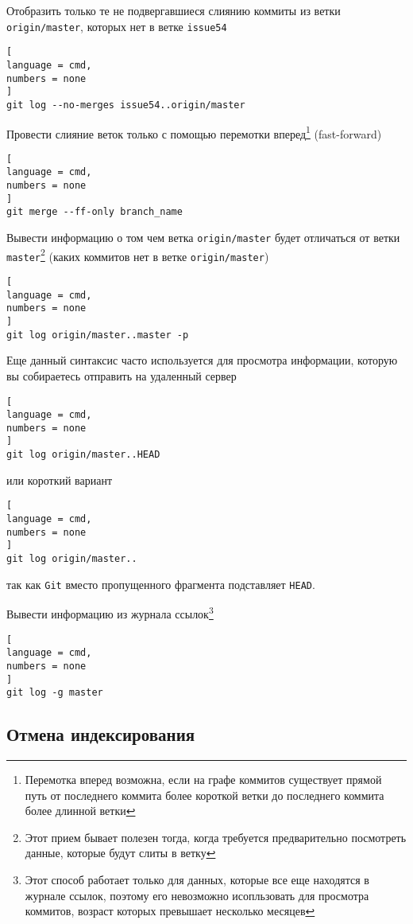 \documentclass[%
	11pt,
	a4paper,
	utf8,
		]{article}
\begin{document}
Отобразить только те не подвергавшиеся слиянию коммиты из ветки \texttt{origin/master}, которых нет в ветке \texttt{issue54}

\begin{lstlisting}[
language = cmd,
numbers = none
]
git log --no-merges issue54..origin/master
\end{lstlisting}

Провести слияние веток только с помощью перемотки вперед\footnote{Перемотка вперед возможна, если на графе коммитов существует прямой путь от последнего коммита более короткой ветки до последнего коммита более длинной ветки} (fast-forward)
\begin{lstlisting}[
language = cmd,
numbers = none
]
git merge --ff-only branch_name
\end{lstlisting}

Вывести информацию о том чем ветка \texttt{origin/master} будет отличаться от ветки \texttt{master}\footnote{Этот прием бывает полезен тогда, когда требуется предварительно посмотреть данные, которые будут слиты в ветку} (каких коммитов нет в ветке \texttt{origin/master})

\begin{lstlisting}[
language = cmd,
numbers = none
]
git log origin/master..master -p
\end{lstlisting}

Еще данный синтаксис часто используется для просмотра информации, которую вы собираетесь отправить на удаленный сервер

\begin{lstlisting}[
language = cmd,
numbers = none
]
git log origin/master..HEAD
\end{lstlisting}
или короткий вариант
\begin{lstlisting}[
language = cmd,
numbers = none
]
git log origin/master..
\end{lstlisting}
так как \texttt{Git} вместо пропущенного фрагмента подставляет \texttt{HEAD}.

Вывести информацию из журнала ссылок\footnote{Этот способ работает только для данных, которые все еще находятся в журнале ссылок, поэтому его невозможно исопльзовать для просмотра коммитов, возраст которых превышает несколько месяцев}

\begin{lstlisting}[
language = cmd,
numbers = none
]
git log -g master
\end{lstlisting}


\subsection{Отмена индексирования}
\end{document}
